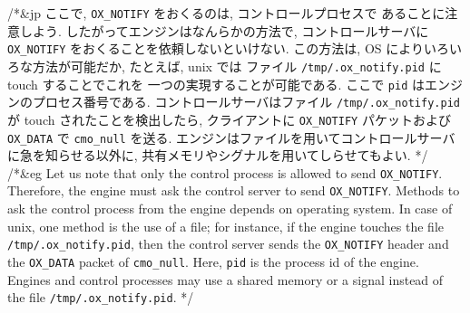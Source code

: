 /*&jp
ここで, {\tt OX\_NOTIFY} をおくるのは, コントロールプロセスで
あることに注意しよう.
したがってエンジンはなんらかの方法で, コントロールサーバに
{\tt OX\_NOTIFY} をおくることを依頼しないといけない.
この方法は, OS によりいろいろな方法が可能だか,
たとえば, unix では
ファイル {\tt /tmp/.ox\_notify.pid} に touch することでこれを
一つの実現することが可能である.
ここで {\tt pid} はエンジンのプロセス番号である.
コントロールサーバはファイル {\tt /tmp/.ox\_notify.pid} が
touch されたことを検出したら, クライアントに
{\tt OX\_NOTIFY} パケットおよび {\tt OX\_DATA} で {\tt cmo\_null} を送る.
エンジンはファイルを用いてコントロールサーバに急を知らせる以外に,
共有メモリやシグナルを用いてしらせてもよい.
*/
/*&eg
Let us note that only the control process is allowed to send {\tt OX\_NOTIFY}.
Therefore, the engine must ask the control server to send
{\tt OX\_NOTIFY}.
Methods to ask the control process from the engine
depends on operating system.
In case of unix, one method is the use of a file;
for instance,
if the engine touches the file
{\tt /tmp/.ox\_notify.pid}, then the control server sends
the {\tt OX\_NOTIFY} header and the {\tt OX\_DATA} packet 
of {\tt cmo\_null}.
Here, {\tt pid} is the process id of the engine.
Engines and control processes may use a shared memory or a signal
instead of the file {\tt /tmp/.ox\_notify.pid}.
*/

